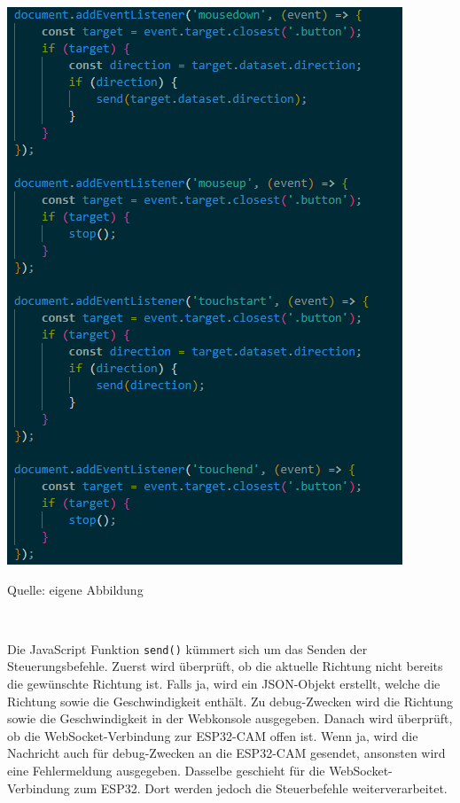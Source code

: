 \documentclass[ngerman,12pt,a4paper]{article}
\begin{document}
	\begin{center}
		\begin{minipage}[t]{0.5\textwidth}
			\includegraphics[scale=0.7]{Pictures/Steuerung-js2}
			\label{fig:Steuerkreuz-js2}
			\vspace{-10pt}
			\begin{center}
				\par\small Quelle: eigene Abbildung 
			\end{center}
		\end{minipage} \\[0.75cm]
	\end{center}
	Die JavaScript Funktion \texttt{send()} kümmert sich um das Senden der Steuerungsbefehle. Zuerst wird überprüft, ob die aktuelle Richtung nicht bereits die gewünschte Richtung ist. Falls ja, wird ein JSON-Objekt erstellt, welche die Richtung sowie die Geschwindigkeit enthält. Zu debug-Zwecken wird die Richtung sowie die Geschwindigkeit in der Webkonsole ausgegeben. Danach wird überprüft, ob die WebSocket-Verbindung zur ESP32-CAM offen ist. Wenn ja, wird die Nachricht auch für debug-Zwecken an die ESP32-CAM gesendet, ansonsten wird eine Fehlermeldung ausgegeben. Dasselbe geschieht für die WebSocket-Verbindung zum ESP32. Dort werden jedoch die Steuerbefehle weiterverarbeitet. \\
\end{document}
